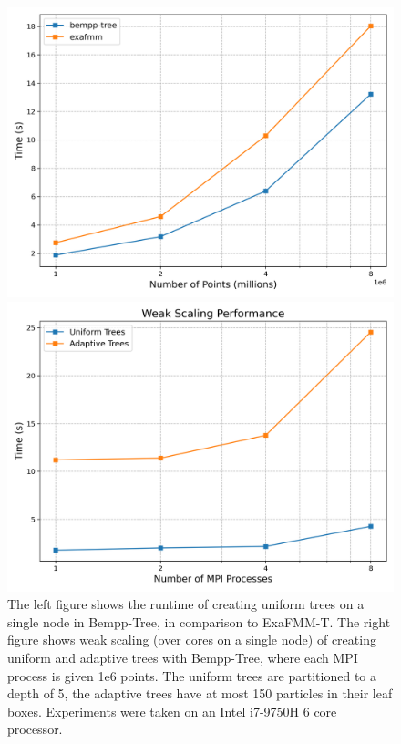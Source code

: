 \begin{figure}[h]
  \centering
  \begin{minipage}[b]{0.45\textwidth}
    \includegraphics[width=\textwidth]{images/ch_3/single_node_scaling.png}
  \end{minipage}
  \hfill
  \begin{minipage}[b]{0.45\textwidth}
    \includegraphics[width=\textwidth]{images/ch_3/weak_scaling_graph.png}
  \end{minipage}
\caption{The left figure shows the runtime of creating uniform trees on a single node in Bempp-Tree, in comparison to ExaFMM-T. The right figure shows weak scaling (over cores on a single node) of creating uniform and adaptive trees with Bempp-Tree, where each MPI process is given 1e6 points. The uniform trees are partitioned to a depth of 5, the adaptive trees have at most 150 particles in their leaf boxes. Experiments were taken on an Intel i7-9750H 6 core processor.}
\label{fig:chpt:3:sec:0:single_node_scaling}
\end{figure}

